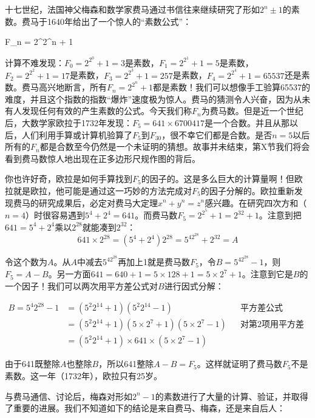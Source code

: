 \documentclass[b5paper]{ctexart}
\begin{document}
十七世纪，法国神父梅森和数学家费马通过书信往来继续研究了形如$2^n \pm 1$的素数。费马于1640年给出了一个惊人的“素数公式”：

\be
F_n = 2^{2^n} + 1
\ee

计算不难发现：$F_0 = 2^{2^0} + 1 = 3$是素数，$F_1 = 2^{2^1} + 1 = 5$是素数，$F_2 = 2^{2^2} + 1 = 17$是素数，$F_3 = 2^{2^3} + 1 = 257$是素数，$F_4 = 2^{2^4} + 1 = 65537$还是素数。费马高兴地断言，所有$F_n = 2^{2^n} + 1$都是素数！我们可以想像手工验算65537的难度，并且这个指数的指数“爆炸”速度极为惊人。费马的猜测令人兴奋，因为从未有人发现任何有效的产生素数的公式。今天我们称$F_n$为费马数。但是近一个世纪后，大数学家欧拉于1732年发现：$F_5= 641 \times 6700417$是一个合数。并且从那以后，人们利用手算或计算机验算了$F_5$到$F_{30}$，很不幸它们都是合数。是否$n = 5$以后所有的$F_n$都是合数至今仍然是一个未证明的猜想。故事并未结束，第X节我们将会看到费马数惊人地出现在正多边形尺规作图的背后。

\begin{mdframed}
你也许好奇，欧拉是如何手算找到$F_5$的因子的。这是多么巨大的计算量啊！但欧拉就是欧拉，他可能是通过这一巧妙的方法完成对$F_5$的因子分解的。欧拉重新发现费马的研究成果后，必定对费马大定理$x^n + y^n = z^n$感兴趣。在研究四次方和（$n = 4$）时很容易遇到$5^4 + 2^4= 641$。而费马数$F_5 = 2^{2^5} + 1 = 2^{32} + 1$。注意到把$641 = 5^4 + 2^4$乘以$2^{28}$就能凑到$2^{32}$：
\[
641 \times 2^{28} = (5^4 + 2^4)2^{28} = 5^42^{28} + 2^{32} = A
\]

令这个数为$A$。从$A$中减去$5^42^{28}$再加上1就是费马数$F_5$，令$B = 5^42^{28} - 1$，则$F_5 = A - B$。另一方面$641 = 640 + 1 = 5 \times 128 + 1 = 5 \times 2^{7} + 1$。注意到它是$B$的一个因子！我们可以两次用平方差公式对$B$进行因式分解：

\begin{align*}
B = 5^4 2^{28} - 1 &= (5^2 2^{14} + 1)(5^2 2^{14} - 1) && \text{平方差公式} \\
  &= (5^2 2^{14} + 1)(5 \times 2^7 + 1)(5 \times 2^7 - 1) && \text{对第2项用平方差公式} \\
  &= (5^2 2^{14} + 1) \times 641 \times (5 \times 2^7 - 1)
\end{align*}

由于641既整除$A$也整除$B$，所以641整除$A - B = F_5$。这样就证明了费马数$F_5$不是素数。这一年（1732年），欧拉只有25岁。
\end{mdframed}

与费马通信、讨论后，梅森对形如$2^n - 1$的素数进行了大量的计算、验证，并取得了重要的进展。我们不知道如下的结论是来自费马、梅森，还是来自后人：
\end{document}
